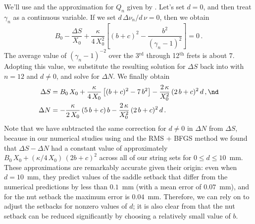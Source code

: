 We'll use  and the approximation for $Q_n$ given by . Let's set $d = 0$, and then treat $\gamma_n$ as a continuous variable. If we set $d\, \Delta \nu_n / d\, \nu = 0$, then we obtain
\begin{equation}
  B_0 - \frac{\Delta S}{X_0} + \frac{\kappa}{4\, X_0^2} \left[ (b + c)^2 - \frac{b^2}{(\gamma_n - 1)^2} \right] = 0\, .
\end{equation}
The average value of $(\gamma_n - 1)^{-2}$ over the 3$^\textrm{rd}$ through 12$^\textrm{th}$ frets is about $7$. Adopting this value, we substitute the resulting solution for $\Delta S$ back into  with $n = 12$ and $d \ne 0$, and solve for $\Delta N$. We finally obtain
\begin{subequations} \label{eqn:comp_approx}
  \begin{align}
    \label{eqn:comp_approx_ds} \Delta S &= B_0\, X_0 + \frac{\kappa}{4\, X_0} \left[(b + c)^2 - 7\, b^2\right] - \frac{2\, \kappa}{X_0^2}\, (2\, b + c)^2\, d\, , \nd \\
    \label{eqn:comp_approx_dn} \Delta N &= -\frac{\kappa}{2\, X_0}\, (5\, b + c)\, b - \frac{2\, \kappa}{X_0^2}\, (2\, b + c)^2\, d\, .
  \end{align}
\end{subequations}
Note that we have subtracted the same correction for $d \ne 0$ in $\Delta N$ from $\Delta S$, because in our numerical studies using  and the RMS + BFGS method we found that $\Delta S - \Delta N$ had a constant value of approximately $B_0\, X_0 + (\kappa/4\, X_0)\, (2 b + c)^2$ across all of our string sets for $0 \le d \le 10$~mm. These approximations are remarkably accurate given their origin: even when $d = 10$~mm, they predict values of the saddle setback that differ from the numerical predictions by less than $0.1$~mm (with a mean error of $0.07$~mm), and for the nut setback the maximum error is $0.04$~mm. Therefore, we can rely on  to adjust the setbacks for nonzero values of $d$; it is also clear from  that the nut setback can be reduced significantly by choosing a relatively small value of $b$.


